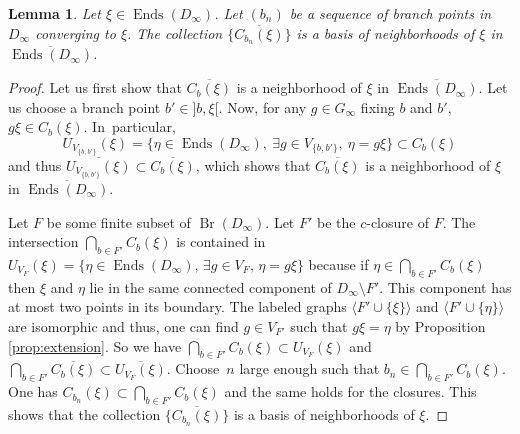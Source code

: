 \documentclass[JEP,XML,SOM,Unicode,NoFloatCountersInSection]{cedram}
\theoremstyle{plain}
\newtheorem{lem}[thm]{Lemma}
\theoremstyle{definition}
\DeclareMathOperator{\Ends}{Ends}
\DeclareMathOperator{\Br}{Br}
\begin{document}
\begin{lem}\label{basis}Let $\xi\in \Ends(D_\infty)$. Let $(b_n)$ be a sequence of branch points in $D_\infty$ converging to $\xi$. The collection $\bigl\{\overline{C_{b_n}(\xi)}\bigr\}$ is a basis of neighborhoods of $\xi$ in $\overline{\Ends(D_\infty)}$.
\end{lem}

\begin{proof}Let us first show that $\overline{C_b(\xi)}$ is a neighborhood of $\xi$ in $\overline{\Ends(D_\infty)}$. Let us choose a branch point $b'\in{}]b,\xi[$. Now, for any $g\in G_\infty$ fixing $b$ and $b'$, $g\xi\in C_b(\xi)$. In~particular,
\[
U_{V_{\{b,b'\}}}(\xi)=\{\eta\in\Ends(D_\infty),\ \exists g\in V_{\{b,b'\}},\ \eta=g\xi\}\subset C_b(\xi)
\]
and thus $\overline{U_{V_{\{b,b'\}}}(\xi)}\subset \overline{C_b(\xi)}$, which shows that $\overline{C_b(\xi)}$ is a neighborhood of $\xi$ in $\overline{\Ends(D_\infty)}$.

Let $F$ be some finite subset of $\Br(D_\infty)$. Let $F'$ be the $c$-closure of $F$. The intersection $\bigcap_{b\in F'}C_b(\xi)$ is contained in $ U_{V_F}(\xi)=\{\eta\in\Ends(D_\infty),\, \exists g\in V_F,\, \eta=g\xi\}$ because if $\eta\in\bigcap_{b\in F'}C_b(\xi)$ then $\xi$ and $\eta$ lie in the same connected component of $D_\infty\setminus F'$. This component has at most two points in its boundary. The labeled graphs $\langle F'\cup\{\xi\}\rangle$ and $\langle F'\cup\{\eta\}\rangle$ are isomorphic and thus, one can find $g\in V_{F'}$ such that $g\xi=\eta$ by Proposition \ref{prop:extension}.
So we have $\bigcap_{b\in F'}C_b(\xi)\subset U_{V_F}(\xi)$ and $\bigcap_{b\in F'}\overline{C_b(\xi)}\subset \overline{U_{V_F}(\xi)}$. Choose~$n$ large enough such that $b_n\in \bigcap_{b\in F'} C_b(\xi)$. One has $C_{b_n}(\xi)\subset \bigcap_{b\in F'} C_b(\xi)$ and the same holds for the closures. This shows that the collection $\bigl\{\overline{C_{b_n}(\xi)}\bigr\}$ is a basis of neighborhoods of $\xi$.
\end{proof}
\end{document}
